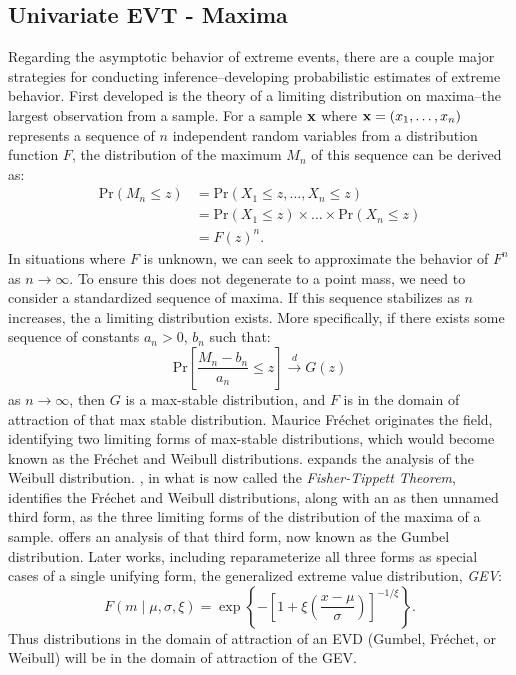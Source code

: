 \subsection{Univariate EVT - Maxima}
Regarding the asymptotic behavior of extreme events, there are a couple major strategies for conducting
  inference--developing probabilistic estimates of extreme behavior.  First developed is the theory
  of a limiting distribution on maxima--the largest observation from a sample.  For a sample ${\bf x}$
  where ${\bf x} = (x_1,\ldots,x_n)$ represents a sequence of $n$ independent random variables from a
  distribution function $F$, the distribution of the maximum $M_n$ of this sequence can be derived
  as:
  \begin{equation*}
    \begin{aligned}
      \text{Pr}(M_n\leq z) &= \text{Pr}(X_1 \leq z, \ldots, X_n \leq z)\\
        &= \text{Pr}(X_1\leq z)\times\ldots\times\text{Pr}(X_n\leq z)\\
        &= F(z)^n.
    \end{aligned}
  \end{equation*}
  In situations where $F$ is unknown, we can seek to approximate the behavior of $F^n$ as
  $n\rightarrow\infty$.  To ensure this does not degenerate to a point mass, we need to consider a
  standardized sequence of maxima. If this sequence stabilizes as $n$ increases, the a limiting
  distribution exists.  More specifically, if there exists some sequence of constants $a_n > 0$, $b_n$
  such that:
  \begin{equation*}
    \text{Pr}\left[\frac{M_n - b_n}{a_n} \leq z\right] \stackrel{d}{\rightarrow} G(z)
  \end{equation*}
  as $n\rightarrow\infty$, then $G$ is a max-stable distribution, and $F$ is in the domain of
  attraction of that max stable distribution.  Maurice Fr{\'e}chet \cite{frechet1927} originates the
  field, identifying two limiting forms of max-stable distributions, which would become known as the
  Fr{\'e}chet and Weibull distributions. \cite{weibull1951} expands the analysis of the Weibull
  distribution.  \cite{fisher1928}, in what is now called the \emph{Fisher-Tippett Theorem}, identifies
  the Fr{\'e}chet and Weibull distributions, along with an as then unnamed third form, as the three
  limiting forms of the distribution of the maxima of a sample.  \cite{gumbel1935,gumbel1942} offers
   an analysis of that third form, now known as the Gumbel distribution.  Later works, including
   \cite{jenkinson1955} reparameterize all three forms as special cases of a single unifying form,
   the generalized extreme value distribution, \emph{GEV}:
  \begin{equation*}
    \label{eqn:gev}
    F(m \mid \mu, \sigma, \xi) = \exp\left\lbrace-\left[1 + \xi\left(\frac{x - \mu}{\sigma}\right)\right]_{}^{-1/{\xi}}\right\rbrace.
  \end{equation*}
  Thus distributions in the domain of attraction of an EVD (Gumbel, Fr{\'e}chet, or Weibull) will be
  in the domain of attraction of the GEV.

